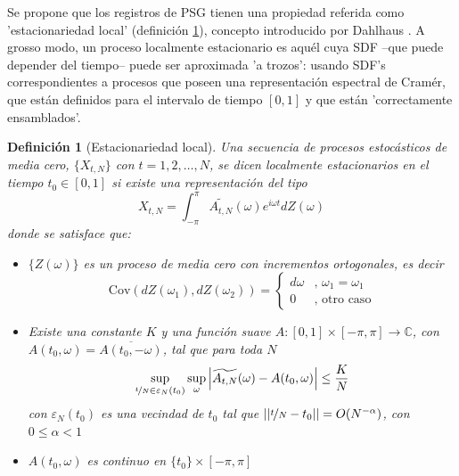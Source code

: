 \documentclass[12pt,a4paper]{mitthesis}
\newtheorem{defn}{Definici\'on}
\newcommand{\intPI}{\int_{-\pi}^{\pi}}
\newcommand{\Cov}[1]{\mathrm{Cov}\left( #1 \right)}
\newcommand{\abso}[1]{\left| #1 \right|}
\begin{document}
Se propone que los registros de PSG tienen una propiedad referida como 'estacionariedad local'
(definici\'on \ref{est_local}), concepto introducido por Dahlhaus \cite{Dahlhaus97}.
A grosso modo, un proceso localmente estacionario es aqu\'el cuya SDF --que puede depender del 
tiempo-- puede ser aproximada 'a trozos': usando SDF's correspondientes a procesos que poseen una 
representaci\'on espectral de Cram\'er, que est\'an definidos para el intervalo de tiempo $[0,1]$ 
y que est\'an 'correctamente ensamblados'.

\begin{defn}[Estacionariedad local]
Una secuencia de procesos estoc\'asticos de media cero, 
$\{ X_{t,N} \}$ con $t = 1, 2, \dots, N$, se dicen localmente estacionarios en el 
tiempo $t_0 \in [0,1]$ si existe una representaci\'on del tipo
\begin{equation*}
X_{t,N} = \intPI \widetilde{A_{t,N}}(\omega) e^{i \omega t} dZ(\omega)
\end{equation*}
donde se satisface que:
\begin{itemize}
\item $\{ Z(\omega) \}$ es un proceso de media cero con incrementos ortogonales, es decir
\begin{equation*}
\Cov{dZ(\omega_1),dZ(\omega_2)} =
\begin{cases}
d\omega &\text{, } \omega_1 = \omega_1 \\
0 &\text{, otro caso}
\end{cases}
\end{equation*}
\item Existe una constante $K$ y una funci\'on suave 
$A: [0,1]\times [-\pi,\pi] \rightarrow \mathbb{C}$, 
con $A(t_0,\omega) = \overline{A(t_0,-\omega)}$, tal que para toda $N$
\begin{equation*}
\sup_{\nicefrac{t}{N}\in \varepsilon_N(t_0)} 
\sup_{\omega} \abso{ \widetilde{A_{t,N}}(\omega) - A(t_0,\omega) }
\leq \frac{K}{N}
\end{equation*}
con $\varepsilon_N(t_0)$ es una vecindad de $t_0$ 
tal que $\abso{\abso{\nicefrac{t}{N}-t_0}} = O(N^{-\alpha})$,
con $0\leq \alpha < 1$
\item $A(t_0,\omega)$ es continuo en $\{ t_0 \} \times [-\pi,\pi]$
\end{itemize}
\label{est_local}
\end{defn}
\end{document}
